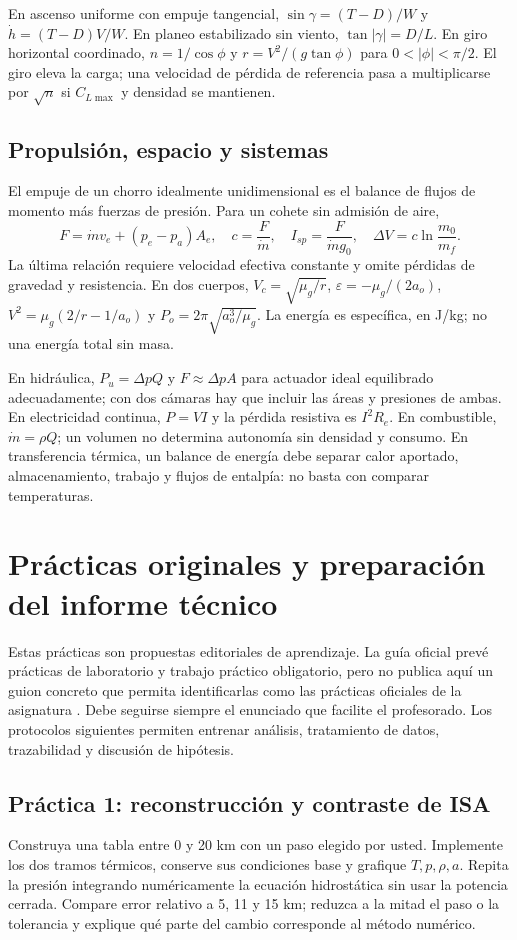 En ascenso uniforme con empuje tangencial, $\sin\gamma=(T-D)/W$ y $\dot h=(T-D)V/W$. En planeo estabilizado sin viento, $\tan|\gamma|=D/L$. En giro horizontal coordinado, $n=1/\cos\phi$ y $r=V^2/(g\tan\phi)$ para $0<|\phi|<\pi/2$. El giro eleva la carga; una velocidad de pérdida de referencia pasa a multiplicarse por $\sqrt n$ si $C_{L\max}$ y densidad se mantienen.

\section{Propulsión, espacio y sistemas}
El empuje de un chorro idealmente unidimensional es el balance de flujos de momento más fuerzas de presión. Para un cohete sin admisión de aire,
\begin{equation}
F=\dot m v_e+(p_e-p_a)A_e,\quad
c=\frac{F}{\dot m},\quad I_{sp}=\frac{F}{\dot m g_0},\quad
\Delta V=c\ln\frac{m_0}{m_f}.
\end{equation}
La última relación requiere velocidad efectiva constante y omite pérdidas de gravedad y resistencia. En dos cuerpos, $V_c=\sqrt{\mu_g/r}$, $\varepsilon=-\mu_g/(2a_o)$, $V^2=\mu_g(2/r-1/a_o)$ y $P_o=2\pi\sqrt{a_o^3/\mu_g}$. La energía es específica, en J/kg; no una energía total sin masa.

En hidráulica, $P_u=\Delta p Q$ y $F\approx\Delta p A$ para actuador ideal equilibrado adecuadamente; con dos cámaras hay que incluir las áreas y presiones de ambas. En electricidad continua, $P=VI$ y la pérdida resistiva es $I^2R_e$. En combustible, $\dot m=\rho Q$; un volumen no determina autonomía sin densidad y consumo. En transferencia térmica, un balance de energía debe separar calor aportado, almacenamiento, trabajo y flujos de entalpía: no basta con comparar temperaturas.

\chapter{Prácticas originales y preparación del informe técnico}\label{ap:practicas}
Estas prácticas son propuestas editoriales de aprendizaje. La guía oficial prevé prácticas de laboratorio y trabajo práctico obligatorio, pero no publica aquí un guion concreto que permita identificarlas como las prácticas oficiales de la asignatura \cite{GUIA2026}. Debe seguirse siempre el enunciado que facilite el profesorado. Los protocolos siguientes permiten entrenar análisis, tratamiento de datos, trazabilidad y discusión de hipótesis.

\section{Práctica 1: reconstrucción y contraste de ISA}
Construya una tabla entre 0 y 20 km con un paso elegido por usted. Implemente los dos tramos térmicos, conserve sus condiciones base y grafique $T,p,\rho,a$. Repita la presión integrando numéricamente la ecuación hidrostática sin usar la potencia cerrada. Compare error relativo a 5, 11 y 15 km; reduzca a la mitad el paso o la tolerancia y explique qué parte del cambio corresponde al método numérico.

